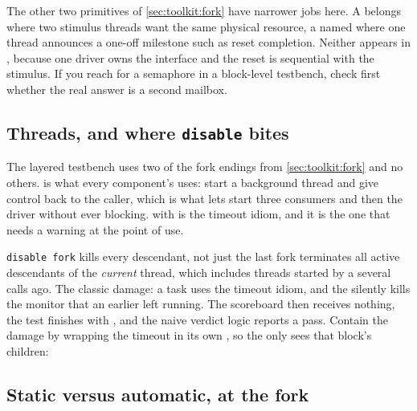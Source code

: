 The other two primitives of \cref{sec:toolkit:fork} have narrower jobs here. A
 belongs where two stimulus threads want the same physical
resource, a named  where one thread announces a one-off milestone
such as reset completion. Neither appears in , because
one driver owns the interface and the reset is sequential with the stimulus. If
you reach for a semaphore in a block-level testbench, check first whether the
real answer is a second mailbox.

\subsection{Threads, and where \texttt{disable} bites}

The layered testbench uses two of the fork endings from
\cref{sec:toolkit:fork} and no others.  is what every component's
 uses: start a background thread and give control back to the
caller, which is what lets  start three consumers and
then the driver without ever blocking.  with  is the timeout
idiom, and it is the one that needs a warning at the point of use.

\begin{gotcha}{\texttt{disable fork} kills every descendant, not just the last fork}
 terminates all active descendants of the \emph{current}
thread, which includes threads started by a  several calls
ago. The classic damage: a task uses the timeout idiom, and the
 silently kills the monitor that an earlier
 left running. The scoreboard then receives nothing, the test
finishes with , and the naive verdict logic reports a
pass. Contain the damage by wrapping the timeout in its own
, so the  only sees that block's children:

\end{gotcha}

\subsection{Static versus automatic, at the fork}

